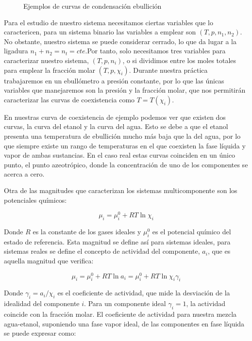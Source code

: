 \documentclass[a4paper,12pt,titlepage]{article}
\begin{document}
\begin{figure}[h!]
\begin{subfigure}{0.45\textwidth}
    \end{subfigure}
    \caption{Ejemplos de curvas de condensación ebullición}
\end{figure}

Para el estudio de nuestro sistema necesitamos ciertas variables que lo caractericen, para un sistema binario las variables a emplear son $(T,p,n_1,n_2)$. No obstante, nuestro sistema se puede considerar cerrado, lo que da lugar a la ligadura $n_1+n_2 = n_t = cte.$Por tanto, solo necesitamos tres variables para caracterizar nuestro sistema, $(T,p,n_i)$, o si dividimos entre los moles totales para emplear la fracción molar $(T,p,\chi_i)$. Durante nuestra práctica trabajaremos en un ebullómetro a presión constante, por lo que las únicas variables que manejaremos son la presión y la fracción molar, que nos permitirán caracterizar las curvas de coexistencia como $T=T(\chi_i)$.

En nuestras curva de coexistencia de ejemplo podemos ver que existen dos curvas, la curva del etanol y la curva del agua. Esto se debe a que el etanol presenta una temperatura de ebullición mucho más baja que la del agua, por lo que siempre existe un rango de temperaturas en el que coexisten la fase líquida y vapor de ambas sustancias. En el caso real estas curvas coinciden en un único punto, el punto azeotrópico, donde la concentración de uno de los componentes se acerca a cero.

Otra de las magnitudes que caracterizan los sistemas multicomponente son los potenciales químicos:

\begin{equation}
    \mu_i = \mu_i^0 + RT\ln \chi_i
\end{equation}

Donde $R$ es la constante de los gases ideales y $\mu_i^0$ es el potencial químico del estado de referencia. Esta magnitud se define así para sistemas ideales, para sistemas reales se define el concepto de actividad del componente, $a_i$, que es aquella magnitud que verifica:

\begin{equation}
    \mu_i = \mu_i^0 + RT \ln a_i = \mu_i^0 + RT \ln \chi_i \gamma_i
\end{equation}

Donde $\gamma_i = a_i/\chi_i$ es el coeficiente de actividad, que mide la desviación de la idealidad del componente $i$. Para un componente ideal $\gamma_i=1$, la actividad coincide con la fracción molar. El coeficiente de actividad para nuestra mezcla agua-etanol, suponiendo una fase vapor ideal, de las componentes en fase líquida se puede expresar como:
\end{document}

